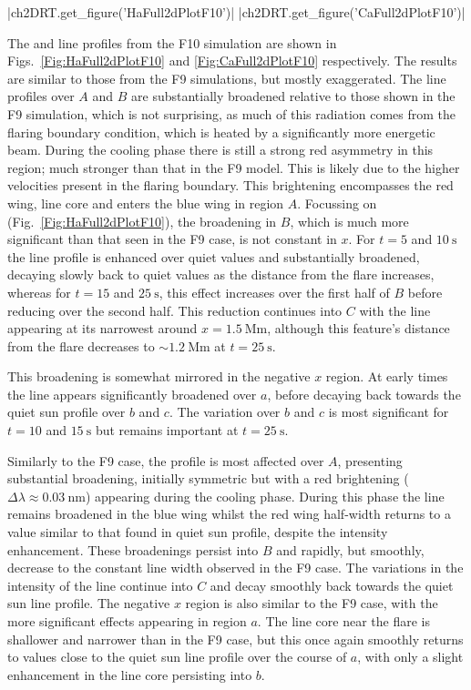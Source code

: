 \py[2DRT]|ch2DRT.get_figure('HaFull2dPlotF10')|
\py[2DRT]|ch2DRT.get_figure('CaFull2dPlotF10')|

The \Ha{} and \CaLine{} line profiles from the F10 simulation are shown in Figs.~\ref{Fig:HaFull2dPlotF10} and \ref{Fig:CaFull2dPlotF10} respectively.
The results are similar to those from the F9 simulations, but mostly exaggerated.
The line profiles over $A$ and $B$ are substantially broadened relative to those shown in the F9 simulation, which is not surprising, as much of this radiation comes from the flaring boundary condition, which is heated by a significantly more energetic beam.
During the cooling phase there is still a strong red asymmetry in this region; much stronger than that in the F9 model.
This is likely due to the higher velocities present in the flaring boundary.
This brightening encompasses the red wing, line core and enters the blue wing in region $A$.
Focussing on \Ha{} (Fig.~\ref{Fig:HaFull2dPlotF10}), the broadening in $B$, which is much more significant than that seen in the F9 case, is not constant in $x$.
For $t=5$ and $\SI{10}{\second}$ the line profile is enhanced over quiet values and substantially broadened, decaying slowly back to quiet values as the distance from the flare increases, whereas for $t=15$ and $\SI{25}{\second}$, this effect increases over the first half of $B$ before reducing over the second half.
This reduction continues into $C$ with the line appearing at its narrowest around $x=\SI{1.5}{\mega\metre}$, although this feature's distance from the flare decreases to $\sim\SI{1.2}{\mega\metre}$ at $t=\SI{25}{\second}$.

This broadening is somewhat mirrored in the negative $x$ region.
At early times the line appears significantly broadened over $a$, before decaying back towards the quiet sun profile over $b$ and $c$.
The variation over $b$ and $c$ is most significant for $t=10$ and $\SI{15}{\second}$ but remains important at $t=\SI{25}{\second}$.

Similarly to the F9 case, the \CaLine{} profile is most affected over $A$, presenting substantial broadening, initially symmetric but with a red brightening ($\Delta\lambda\approx\SI{0.03}{\nano\metre}$) appearing during the cooling phase.
During this phase the line remains broadened in the blue wing whilst the red wing half-width returns to a value similar to that found in quiet sun profile, despite the intensity enhancement.
These broadenings persist into $B$ and rapidly, but smoothly, decrease to the constant line width observed in the F9 case.
The variations in the intensity of the line continue into $C$ and decay smoothly back towards the quiet sun line profile.
The negative $x$ region is also similar to the F9 case, with the more significant effects appearing in region $a$.
The line core near the flare is shallower and narrower than in the F9 case, but this once again smoothly returns to values close to the quiet sun line profile over the course of $a$, with only a slight enhancement in the line core persisting into $b$.

